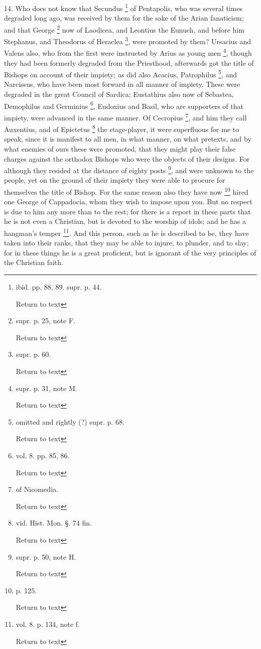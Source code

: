 14. Who does not know that Secundus \footnote{ibid. pp. 88, 89. supr. p. 44.

Return to text} of Pentapolis, who was several times degraded long ago, was
received by them for the sake of the Arian fanaticism; and that George
\footnote{supr. p. 25, note F.

Return to text} now of Laodicea, and
Leontius the Eunuch, and before him Stephanus, and Theodorus of
Heraclea \footnote{supr. p. 60.

Return to text}, were
promoted by them? Ursacius and Valens also, who from the first were
instructed by Arius as young men \footnote{supr. p. 31, note M.

Return to text}, though they had been formerly degraded from the Priesthood,
afterwards got the title of Bishops on account of their impiety; as
did also Acacius, Patrophilus \footnote{omitted and rightly (?) supr. p. 68.

Return to text}, and Narcissus, who have been most forward in all manner of
impiety. These were degraded in the great Council of Sardica;
Eustathius also now of Sebastea, Demophilus and Germinius \footnote{vol. 8. pp. 85, 86.

Return to text}, Eudoxius and Basil, who are supporters of that impiety, were
advanced in the same manner. Of Cecropius \footnote{of Nicomedia.

Return to text}, and him they call Auxentius, and of Epictetus \footnote{vid. Hist. Mon. §. 74 fin.

Return to text} the stage-player, it were superfluous for me to speak, since
it is manifest to all men, in what manner, on what pretexts, and by
what enemies of ours these were promoted, that they might play their
false charges against the orthodox Bishops who were the objects of
their designs. For although they resided at the distance of eighty
posts \footnote{supr. p. 50, note H.

Return to text}, and were
unknown to the people, yet on the ground of their impiety they were
able to procure for themselves the title of Bishop. For the same
reason also they have now \footnote{p. 125.

Return to text}
hired one George of Cappadocia, whom they wish to impose upon you. But
no respect is due to him any more than to the rest; for there is a
report in these parts that he is not even a Christian, but is devoted
to the worship of idols; and he has a hangman's temper \footnote{vol. 8. p. 134, note f.

Return to text}. And this person, such as he is described to be, they have
taken into their ranks, that they may be able to injure, to
plunder, and to slay; for in these things he is a great proficient,
but is ignorant of the very principles of the Christian faith.

